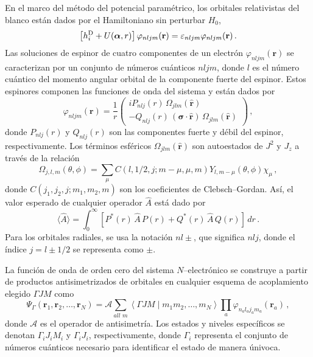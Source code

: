 En el marco del método del potencial paramétrico, los orbitales 
relativistas del blanco están dados por el Hamiltoniano sin perturbar 
$H_0$, 
\begin{equation}
\left[ h_i^{\mbox{\scriptsize D}} +U(\boldsymbol{\alpha},r) \right] 
\varphi_{nljm}(\mathbf{r}) 
= \varepsilon_{nljm} \varphi_{nljm}(\mathbf{r})\,.
\label{eq:ecuacionDirac}
\end{equation}
Las soluciones de espinor de cuatro componentes de un electrón 
$\varphi_{nljm}(\mathbf{r})$ se caracterizan por un conjunto de 
números cuánticos $nljm$, donde $l$ es el número cuántico del momento 
angular orbital de la componente fuerte del espinor. 
%
Estos espinores componen las funciones de onda del sistema y están 
dados por 
\begin{equation}
\varphi_{nljm}(\mathbf{r}) = \frac{1}{r} \left( 
\begin{array}{c}
i P_{nlj}(r) \,\Omega_{jlm}(\hat{\mathbf{r}}) \\ 
- Q_{nlj}(r) \,(\boldsymbol{\sigma}\cdot\hat{\mathbf{r}})\,
\Omega_{jlm}(\hat{\mathbf{r}})
\end{array}
\right)\,,
\label{eq:sepespinor}
\end{equation}
donde $P_{nlj}(r)$ y $Q_{nlj}(r)$ son las componentes fuerte y débil del
espinor, respectivamente. Los términos esféricos 
$\Omega_{jlm}(\hat{\mathbf{r}})$ son autoestados de $J^2$ y $J_z$ a 
través de la relación
\begin{equation}
\Omega_{j,l,m}(\theta,\phi)=\sum_{\mu} C(l,1/2,j;m-\mu,\mu,m) 
Y_{l,m-\mu}(\theta,\phi)\chi_{\mu}\,,
\end{equation}
donde $C\left(j_1,j_2,j;m_1,m_2,m\right)$ son los coeficientes de 
Clebsch--Gordan. Así, el valor esperado de cualquier operador $\hat{A}$ 
está dado por
\begin{equation}
\langle\hat{A}\rangle=\int_0^{\infty}\left[P^*(r)\,\hat{A}\,P(r) 
 +Q^*(r)\,\hat{A}\,Q(r)
\right]\,dr\,.
\label{eq:meanvalr}
\end{equation}
Para los orbitales radiales, se usa la notación $nl\pm$, que significa 
$nlj$, donde el índice $j=l\pm1/2$ se representa como $\pm$.

La función de onda de orden cero del sistema $N$--electrónico se 
construye a partir de productos antisimetrizados de orbitales en 
cualquier esquema de acoplamiento elegido $\Gamma JM$ como 
\begin{equation}
\Psi_{\Gamma}\left(\mathbf{r}_1,\mathbf{r}_2,\ldots,\mathbf{r}_N\right)
=\mathcal{A}\sum_{all\,\,m}\left\langle\Gamma JM\mid m_1 m_2,\ldots,m_{N}\right
\rangle \prod_{a} \varphi_{n_a l_a j_a m_a}\left(\mathbf{r}_a\right)\,,
\end{equation}
donde $\mathcal{A}$ es el operador de antisimetría. Los estados y niveles 
específicos se denotan $\Gamma_iJ_iM_i$ y $\Gamma_iJ_i$, respectivamente,
donde $\Gamma_i$ representa el conjunto de números cuánticos necesario 
para identificar el estado de manera únivoca. 


